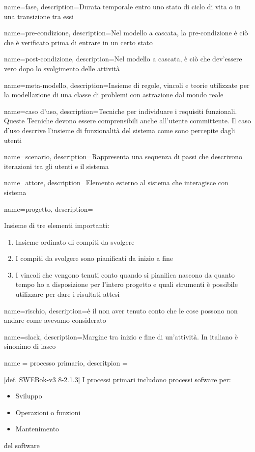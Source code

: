 {
name=fase,
description={Durata temporale entro uno stato di ciclo di vita o in una transizione tra essi}
}


{
name=pre-condizione,
description={Nel modello a cascata, la pre-condizione \`e ci\`o che \`e verificato prima di entrare in un certo stato}
}

{
name=post-condizione,
description={Nel modello a cascata, \`e ci\`o che dev'essere vero dopo lo svolgimento delle attivit\`a}
}

{
name=meta-modello,
description={Insieme di regole, vincoli e teorie utilizzate per la modellazione di una classe di problemi con astrazione dal mondo reale}
}

{
name=caso d'uso,
description={Tecniche per individuare i requisiti funzionali. Queste Tecniche devono essere comprensibili anche all'utente committente. Il caso d'uso descrive l'insieme di funzionalit\`a del sistema come sono percepite dagli utenti}
}

{
name=scenario,
description={Rappresenta una sequenza di passi che descrivono iterazioni tra gli utenti e il sistema}
}

{
name=attore,
description={Elemento esterno al sistema che interagisce con sistema}
}

{
name=progetto,
description={Insieme di tre elementi importanti: \begin{enumerate}
\item Insieme ordinato di compiti da svolgere
\item I compiti da svolgere sono pianificati da inizio a fine
\item I vincoli che vengono tenuti conto quando si pianifica nascono da quanto tempo ho a disposizione per l'intero progetto e quali strumenti \`e possibile utilizzare per dare i risultati attesi
\end{enumerate}
}
}

{
name=rischio,
description={\`e il non aver tenuto conto che le cose possono non andare come avevamo considerato}
}

{
name=slack,
description={Margine tra inizio e fine di un'attivit\`a. In italiano \`e sinonimo di lasco}
}

{
name = processo primario,
descritpion = {[def. SWEBok-v3 8-2.1.3] I processi primari includono processi sofware per: \begin{itemize}
\item Sviluppo
\item Operazioni o funzioni
\item Mantenimento
\end{itemize}
del software}
}

